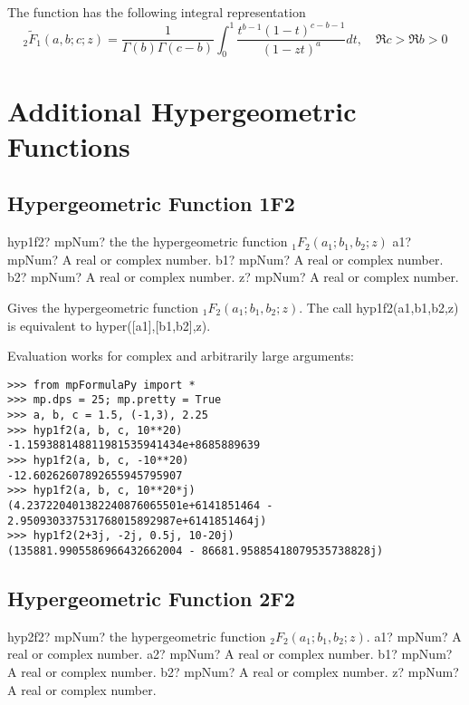 The function has the following integral representation
\begin{equation}
{}_2\widetilde{F}_1(a,b;c;z)  = \frac{1}{\Gamma(b)\Gamma(c-b)} \int_0^1{\frac{t^{b-1}(1-t)^{c-b-1}}{(1-zt)^a}}dt, \quad \Re c > \Re b > 0
\end{equation}






\newpage
\section{Additional Hypergeometric Functions}


\subsection{Hypergeometric Function 1F2}

\begin{mpFunctionsExtract}
	\mpFunctionFour
	{hyp1f2? mpNum? the the hypergeometric function ${}_1F_2(a_1; b_1, b_2; z)$}
	{a1? mpNum? A real or complex number.}
	{b1? mpNum? A real or complex number.}	
	{b2? mpNum? A real or complex number.}		
	{z? mpNum? A real or complex number.}		
\end{mpFunctionsExtract}

\vpara
Gives the hypergeometric function ${}_1F_2(a_1; b_1, b_2; z)$. The call hyp1f2(a1,b1,b2,z) is equivalent to hyper([a1],[b1,b2],z).

Evaluation works for complex and arbitrarily large arguments:

\begin{lstlisting}
>>> from mpFormulaPy import *
>>> mp.dps = 25; mp.pretty = True
>>> a, b, c = 1.5, (-1,3), 2.25
>>> hyp1f2(a, b, c, 10**20)
-1.159388148811981535941434e+8685889639
>>> hyp1f2(a, b, c, -10**20)
-12.60262607892655945795907
>>> hyp1f2(a, b, c, 10**20*j)
(4.237220401382240876065501e+6141851464 - 2.950930337531768015892987e+6141851464j)
>>> hyp1f2(2+3j, -2j, 0.5j, 10-20j)
(135881.9905586966432662004 - 86681.95885418079535738828j)
\end{lstlisting}



\subsection{Hypergeometric Function 2F2}

\begin{mpFunctionsExtract}
	\mpFunctionFive
	{hyp2f2? mpNum? the hypergeometric function  ${}_2F_2(a_1; b_1, b_2; z)$.}
	{a1? mpNum? A real or complex number.}
	{a2? mpNum? A real or complex number.}
	{b1? mpNum? A real or complex number.}
	{b2? mpNum? A real or complex number.}	
	{z? mpNum? A real or complex number.}
\end{mpFunctionsExtract}

